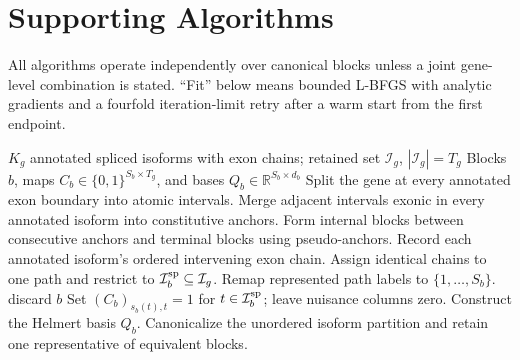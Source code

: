 \documentclass[11pt]{article}
\begin{document}
\section{Supporting Algorithms}

All algorithms operate independently over canonical blocks unless a joint gene-level combination is stated. ``Fit'' below means bounded L-BFGS with analytic gradients and a fourfold iteration-limit retry after a warm start from the first endpoint.

\begin{algorithm}[H]
\caption{Construct splice blocks and path maps}
\label{alg:blocks}
\begin{algorithmic}[1]
\Require \(K_g\) annotated spliced isoforms with exon chains; retained set \(\mathcal I_g\), \(|\mathcal I_g|=T_g\)
\Ensure Blocks \(b\), maps \(C_b\in\{0,1\}^{S_b\times T_g}\), and bases \(Q_b\in\mathbb R^{S_b\times d_b}\)
\State Split the gene at every annotated exon boundary into atomic intervals.
\State Merge adjacent intervals exonic in every annotated isoform into constitutive anchors.
\State Form internal blocks between consecutive anchors and terminal blocks using pseudo-anchors.
  \State Record each annotated isoform's ordered intervening exon chain.
  \State Assign identical chains to one path and restrict to \(\mathcal I_b^{\rm sp}\subseteq\mathcal I_g\).
  \State Remap represented path labels to \(\{1,\ldots,S_b\}\).
    \State discard \(b\)
  \Else
    \State Set \((C_b)_{s_b(t),t}=1\) for \(t\in\mathcal I_b^{\rm sp}\); leave nuisance columns zero.
    \State Construct the Helmert basis \(Q_b\).
  \EndIf
\EndFor
\State Canonicalize the unordered isoform partition and retain one representative of equivalent blocks.
\end{algorithmic}
\end{algorithm}
\end{document}
